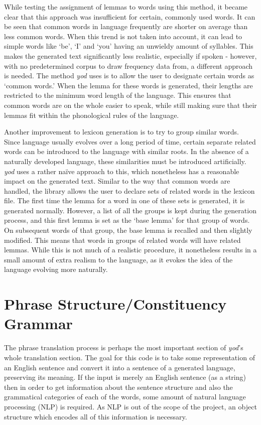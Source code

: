 \documentclass{report}
\begin{document}
	While testing the assignment of lemmas to words using this method, it became clear that this approach was insufficient for certain, commonly used words. It can be seen that common words in language frequently are shorter on average than less common words\cite{miller1958370}\cite{strauss2007word}. When this trend is not taken into account, it can lead to simple words like `be', `I' and `you' having an unwieldy amount of syllables. This makes the generated text significantly less realistic, especially if spoken - however, with no predetermined corpus to draw frequency data from, a different approach is needed. The method \textit{yod} uses is to allow the user to designate certain words as `common words.' When the lemma for these words is generated, their lengths are restricted to the minimum word length of the language. This ensures that common words are on the whole easier to speak, while still making sure that their lemmas fit within the phonological rules of the language.
	
	Another improvement to lexicon generation is to try to group similar words. Since language usually evolves over a long period of time, certain separate related words can be introduced to the language with similar roots. In the absence of a naturally developed language, these similarities must be introduced artificially. \textit{yod} uses a rather na\"ive approach to this, which nonetheless has a reasonable impact on the generated text. Similar to the way that common words are handled, the library allows the user to declare sets of related words in the lexicon file. The first time the lemma for a word in one of these sets is generated, it is generated normally. However, a list of all the groups is kept during the generation process, and this first lemma is set as the `base lemma' for that group of words. On subsequent words of that group, the base lemma is recalled and then slightly modified. This means that words in groups of related words will have related lemmas. While this is not much of a realistic procedure, it nonetheless results in a small amount of extra realism to the language, as it evokes the idea of the language evolving more naturally.
	
	\section{Phrase Structure/Constituency Grammar}
	\label{section: phrase structure/constituency grammar}
	
	The phrase translation process is perhaps the most important section of \textit{yod}'s whole translation section. The goal for this code is to take some representation of an English sentence and convert it into a sentence of a generated language, preserving its meaning. If the input is merely an English sentence (as a string) then in order to get information about the sentence structure and also the grammatical categories of each of the words, some amount of natural language processing (NLP) is required. As NLP is out of the scope of the project, an object structure which encodes all of this information is necessary.
	
\end{document}
